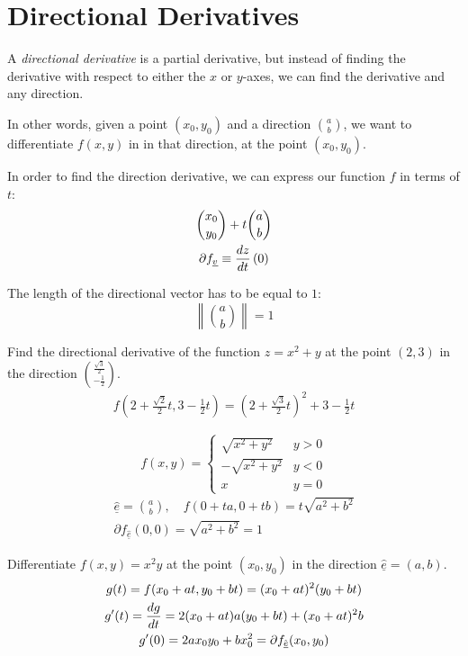 \documentclass[00_complete]{subfiles}
\begin{document}
\section{Directional Derivatives}
\begin{definition}
    A \emph{directional derivative} is a partial derivative, but instead of
    finding the derivative with respect to either the $x$ or $y$-axes, we can
    find the derivative and any direction.

    In other words, given a point $(x_0,y_0)$ and a direction $\binom{a}{b}$, we want
    to differentiate $f(x,y)$ in in that direction, at the point $(x_0,y_0)$.
\end{definition}
In order to find the direction derivative, we can express our function $f$ in
terms of $t$:
\begin{gather*}
    \binom{x_0}{y_0}+t\binom{a}{b} \\
    \partial f_{\underline v} \equiv \dv{z}{t}\left(0\right)
\end{gather*}
\begin{note}
    The length of the directional vector has to be equal to $1$:
    $$\left\|\binom{a}{b}\right\|=1$$
\end{note}
\begin{example}
    Find the directional derivative of the function $z=x^2+y$ at the point
    $(2,3)$ in the direction $\displaystyle\binom{\frac{\sqrt 3}{2}}{-\frac{1}{2}}$.
    \begin{gather*}
        f\left(2+\frac{\sqrt 2}{2}t,3-\frac{1}{2}t\right)=\left(2+\frac{\sqrt
            3}{2} t\right)^2 + 3- \frac{1}{2}t
    \end{gather*}
\end{example}
\begin{example}
    $$f(x,y) = \begin{cases}
        \sqrt{x^2+y^2}& y>0 \\
        -\sqrt{x^2+y^2}& y<0 \\
        x & y=0
    \end{cases}$$
    \begin{gather*}
        \hat{\underline e}=\binom{a}{b},\quad f(0+ta,0+tb) = t\sqrt{a^2+b^2} \\
        \partial f_{\hat{\underline
        e}}\left(0,0\right) = \sqrt{a^2+b^2} = 1
    \end{gather*}
\end{example}
\begin{example}
    Differentiate $f(x,y)=x^2y$ at the point $(x_0,y_0)$ in the direction
    $\hat{\underline e}=(a,b)$.
    \begin{gather*}
        g(t)=f(x_0+at,y_0+bt) = (x_0+at)^2(y_0+bt) \\
        g'(t) =\dv{g}{t} = 2(x_0+at)a(y_0+bt) + (x_0+at)^2b \\
        g'(0)=2ax_0y_0+bx_0^2 = \partial f_{\hat{\underline e}}(x_0,y_0)
    \end{gather*}
\end{example}
\end{document}
